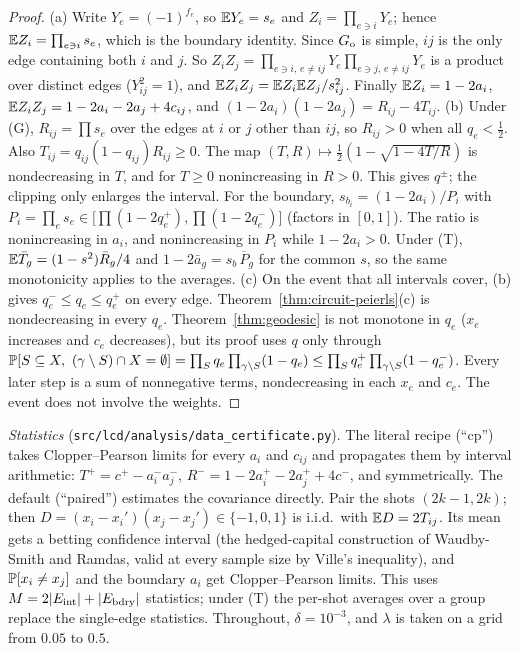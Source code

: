 \begin{proof}
(a) Write $Y_e=(-1)^{f_e}$, so $\mathbb{E} Y_e=s_e$ and $Z_i=\prod_{e\ni i}Y_e$; hence $\mathbb{E} Z_i=\prod_{e\ni i}s_e$, which is the boundary identity. Since $G_{\rm o}$ is simple, $ij$ is the only edge containing both $i$ and $j$. So $Z_iZ_j=\prod_{e\ni i,\,e\ne ij}Y_e\prod_{e\ni j,\,e\ne ij}Y_e$ is a product over distinct edges ($Y_{ij}^2=1$), and $\mathbb{E} Z_iZ_j=\mathbb{E} Z_i\mathbb{E} Z_j/s_{ij}^2$. Finally $\mathbb{E} Z_i=1-2a_i$, $\mathbb{E} Z_iZ_j=1-2a_i-2a_j+4c_{ij}$, and $(1-2a_i)(1-2a_j)=R_{ij}-4T_{ij}$.
(b) Under (G), $R_{ij}=\prod s_e$ over the edges at $i$ or $j$ other than $ij$, so $R_{ij}>0$ when all $q_e<\tfrac12$. Also $T_{ij}=q_{ij}(1-q_{ij})R_{ij}\ge0$. The map $(T,R)\mapsto\tfrac12(1-\sqrt{1-4T/R})$ is nondecreasing in $T$, and for $T\ge0$ nonincreasing in $R>0$. This gives $q^\pm$; the clipping only enlarges the interval. For the boundary, $s_{b_i}=(1-2a_i)/P_i$ with $P_i=\prod_e s_e\in\big[\prod(1-2q_e^+),\prod(1-2q_e^-)\big]$ (factors in $[0,1]$). The ratio is nonincreasing in $a_i$, and nonincreasing in $P_i$ while $1-2a_i>0$. Under (T), $\mathbb{E}\bar T_g=(1-s^2)\bar R_g/4$ and $1-2\bar a_g=s_{b}\,\overline{P}_g$ for the common $s$, so the same monotonicity applies to the averages.
(c) On the event that all intervals cover, (b) gives $q_e^-\le q_e\le q_e^+$ on every edge. Theorem~\ref{thm:circuit-peierls}(c) is nondecreasing in every $q_e$. Theorem~\ref{thm:geodesic} is not monotone in $q_e$ ($x_e$ increases and $c_e$ decreases), but its proof uses $q$ only through $\Prob[S\subseteq X,\ (\gamma\setminus S)\cap X=\emptyset]=\prod_{S}q_e\prod_{\gamma\setminus S}(1-q_e)\le\prod_Sq_e^+\prod_{\gamma\setminus S}(1-q_e^-)$. Every later step is a sum of nonnegative terms, nondecreasing in each $x_e$ and $c_e$. The event does not involve the weights.
\end{proof}

\noindent\emph{Statistics} (\texttt{src/lcd/analysis/data\_certificate.py}). The literal recipe (``cp'') takes Clopper--Pearson limits for every $a_i$ and $c_{ij}$ and propagates them by interval arithmetic: $T^+=c^+-a_i^-a_j^-$, $R^-=1-2a_i^+-2a_j^++4c^-$, and symmetrically. The default (``paired'') estimates the covariance directly. Pair the shots $(2k-1,2k)$; then $D=(x_i-x_i')(x_j-x_j')\in\{-1,0,1\}$ is i.i.d.\ with $\mathbb{E} D=2T_{ij}$. Its mean gets a betting confidence interval (the hedged-capital construction of Waudby-Smith and Ramdas, valid at every sample size by Ville's inequality), and $\mathbb{P}[x_i\ne x_j]$ and the boundary $a_i$ get Clopper--Pearson limits. This uses $M=2|E_{\rm int}|+|E_{\rm bdry}|$ statistics; under (T) the per-shot averages over a group replace the single-edge statistics. Throughout, $\delta=10^{-3}$, and $\lambda$ is taken on a grid from $0.05$ to $0.5$.

